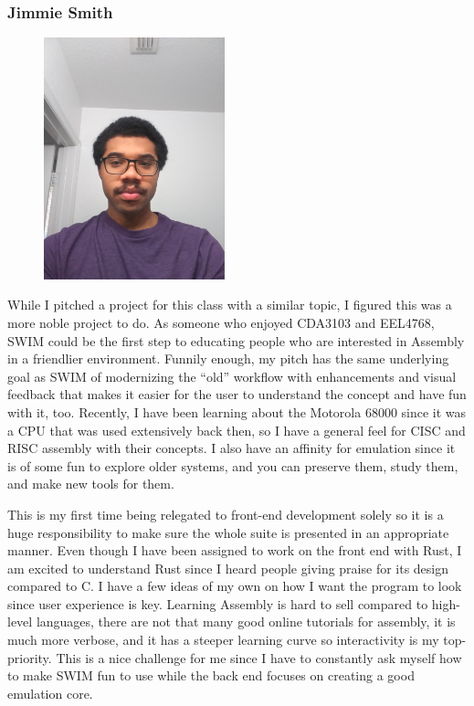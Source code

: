 \documentclass[
    paper=letter,
    parskip=half,
    fontsize=12pt,
    titlepage=firstiscover,
    toc=bibliography,
    numbers=endperiod
]{scrartcl}
\begin{document}
\subsubsection{Jimmie Smith}
\begin{figure}[H]
    \includegraphics[height=7cm]{profile-jimmie}
\end{figure}

While I pitched a project for this class with a similar topic, I figured
this was a more noble project to do. As someone who enjoyed CDA3103 and
EEL4768, SWIM could be the first step to educating people who are
interested in Assembly in a friendlier environment. Funnily enough, my
pitch has the same underlying goal as SWIM of modernizing the “old”
workflow with enhancements and visual feedback that makes it easier for
the user to understand the concept and have fun with it, too. Recently,
I have been learning about the Motorola 68000 since it was a CPU that
was used extensively back then, so I have a general feel for CISC and
RISC assembly with their concepts. I also have an affinity for emulation
since it is of some fun to explore older systems, and you can preserve
them, study them, and make new tools for them.

This is my first time being relegated to front-end development solely so
it is a huge responsibility to make sure the whole suite is presented in
an appropriate manner. Even though I have been assigned to work on the
front end with Rust, I am excited to understand Rust since I heard
people giving praise for its design compared to C. I have a few ideas of
my own on how I want the program to look since user experience is key.
Learning Assembly is hard to sell compared to high-level languages,
there are not that many good online tutorials for assembly, it is much
more verbose, and it has a steeper learning curve so interactivity is my
top-priority. This is a nice challenge for me since I have to constantly
ask myself how to make SWIM fun to use while the back end focuses on
creating a good emulation core.
\end{document}
